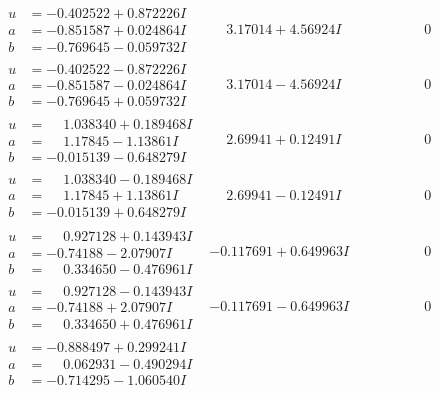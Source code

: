 \documentclass[1p]{elsarticle_modified}
\theoremstyle{definition}
\begin{document}
$$\begin{array}{c|c|c}
\begin{aligned}
u &= -0.402522 + 0.872226 I \\
a &= -0.851587 + 0.024864 I \\
b &= -0.769645 - 0.059732 I\end{aligned}
 & \phantom{-}3.17014 + 4.56924 I & \phantom{-0.000000 } 0 \\ \hline\begin{aligned}
u &= -0.402522 - 0.872226 I \\
a &= -0.851587 - 0.024864 I \\
b &= -0.769645 + 0.059732 I\end{aligned}
 & \phantom{-}3.17014 - 4.56924 I & \phantom{-0.000000 } 0 \\ \hline\begin{aligned}
u &= \phantom{-}1.038340 + 0.189468 I \\
a &= \phantom{-}1.17845 - 1.13861 I \\
b &= -0.015139 - 0.648279 I\end{aligned}
 & \phantom{-}2.69941 + 0.12491 I & \phantom{-0.000000 } 0 \\ \hline\begin{aligned}
u &= \phantom{-}1.038340 - 0.189468 I \\
a &= \phantom{-}1.17845 + 1.13861 I \\
b &= -0.015139 + 0.648279 I\end{aligned}
 & \phantom{-}2.69941 - 0.12491 I & \phantom{-0.000000 } 0 \\ \hline\begin{aligned}
u &= \phantom{-}0.927128 + 0.143943 I \\
a &= -0.74188 - 2.07907 I \\
b &= \phantom{-}0.334650 - 0.476961 I\end{aligned}
 & -0.117691 + 0.649963 I & \phantom{-0.000000 } 0 \\ \hline\begin{aligned}
u &= \phantom{-}0.927128 - 0.143943 I \\
a &= -0.74188 + 2.07907 I \\
b &= \phantom{-}0.334650 + 0.476961 I\end{aligned}
 & -0.117691 - 0.649963 I & \phantom{-0.000000 } 0 \\ \hline\begin{aligned}
u &= -0.888497 + 0.299241 I \\
a &= \phantom{-}0.062931 - 0.490294 I \\
b &= -0.714295 - 1.060540 I\end{aligned}

\end{array}$$
\end{document}
